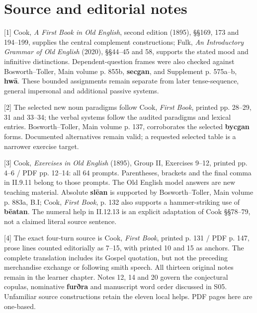 \clearpage
\section*{Source and editorial notes}

\begingroup\fontsize{10}{12.8}\selectfont
[1] Cook, \emph{A First Book in Old English}, second edition (1895), §§169, 173 and 194–199, supplies the central complement constructions; Fulk, \emph{An Introductory Grammar of Old English} (2020), §§44–45 and 58, supports the stated mood and infinitive distinctions. Dependent-question frames were also checked against Bosworth–Toller, Main volume p. 855b, \textbf{secgan}, and Supplement p. 575a–b, \textbf{hwā}. These bounded assignments remain separate from later tense-sequence, general impersonal and additional passive systems.

[2] The selected new noun paradigms follow Cook, \emph{First Book}, printed pp. 28–29, 31 and 33–34; the verbal systems follow the audited paradigms and lexical entries. Bosworth–Toller, Main volume p. 137, corroborates the selected \textbf{bycgan} forms. Documented alternatives remain valid; a requested selected table is a narrower exercise target.

[3] Cook, \emph{Exercises in Old English} (1895), Group II, Exercises 9–12, printed pp. 4–6 /\allowbreak{} PDF pp. 12–14: all 64 prompts. Parentheses, brackets and the final comma in II.9.11 belong to those prompts. The Old English model answers are new teaching material. Absolute \textbf{slēan} is supported by Bosworth–Toller, Main volume p. 883a, B.I; Cook, \emph{First Book}, p. 132 also supports a hammer-striking use of \textbf{bēatan}. The numeral help in II.12.13 is an explicit adaptation of Cook §§78–79, not a claimed literal source sentence.

[4] The exact four-turn source is Cook, \emph{First Book}, printed p. 131 /\allowbreak{} PDF p. 147, prose lines counted editorially as 7–15, with printed 10 and 15 as anchors. The complete translation includes its Gospel quotation, but not the preceding merchandise exchange or following smith speech. All thirteen original notes remain in the learner chapter. Notes 12, 14 and 20 govern the conjectural copulas, nominative \textbf{furðra} and manuscript word order discussed in S05. Unfamiliar source constructions retain the eleven local helps. PDF pages here are one-based.

\endgroup

\par\label{end-ch09-key}
\clearpage\endgroup
